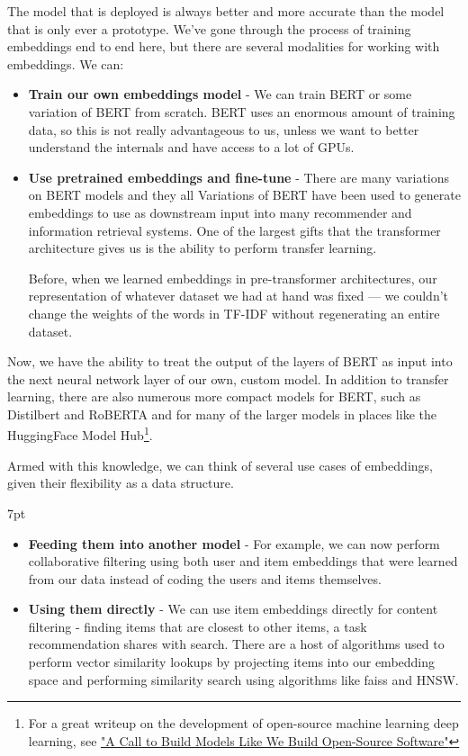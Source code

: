 \documentclass[11pt, table]{diazessay} %
\newenvironment{formal}{%
  \def\FrameCommand{%
	\hspace{1pt}%
	{\color{w_lightblue}\vrule width 2pt}%
	{\color{formalshade}\vrule width 4pt}%
	\colorbox{formalshade}%
  }%
  \MakeFramed{\advance\hsize-\width\FrameRestore}%
  \noindent\hspace{-4.55pt}%
  \begin{adjustwidth}{}{7pt}%
  \vspace{2pt}\vspace{2pt}%
}
{%
  \vspace{2pt}\end{adjustwidth}\endMakeFramed%
}
\begin{document}
\begin{sloppypar}
The model that is deployed is always better and more accurate than the model that is only ever a prototype. We've gone through the process of training embeddings end to end here, but there are several modalities for working with embeddings. We can:

\begin{itemize}
\item \textbf{Train our own embeddings model} - We can train BERT or some variation of BERT from scratch. BERT uses an enormous amount of training data, so this is not really advantageous to us, unless we want to better understand the internals and have access to a lot of GPUs.
\item \textbf{Use pretrained embeddings and fine-tune } - There are many variations on BERT models and they all Variations of BERT have been used to generate embeddings to use as downstream input into many recommender and information retrieval systems.  One of the largest gifts that the transformer architecture gives us is the ability to perform transfer learning. 

Before, when we learned embeddings in pre-transformer architectures, our representation of whatever dataset we had at hand was fixed --- we couldn't change the weights of the words in TF-IDF without regenerating an entire dataset. 
\end{itemize}

Now, we have the ability to treat the output of the layers of BERT as input into the next neural network layer of our own, custom model. In addition to transfer learning, there are also numerous more compact models for BERT, such as Distilbert and RoBERTA and for many of the larger models in places like the HuggingFace Model Hub\footnote{For a great writeup on the development of open-source machine learning deep learning, see  \href{https://colinraffel.com/blog/a-call-to-build-models-like-we-build-open-source-software.html}{"A Call to Build Models Like We Build Open-Source Software"}}.  

Armed with this knowledge, we can think of several use cases of embeddings, given their flexibility as a data structure.

\begin{formal}
\begin{itemize}
\item\textbf{Feeding them into another model} - For example, we can now perform collaborative filtering using both user and item embeddings that were learned from our data instead of coding the users and items themselves.
\item\textbf{Using them directly} - We can use item embeddings directly for content filtering - finding items that are closest to other items, a task recommendation shares with search. There are a host of algorithms used to perform vector similarity lookups by projecting items into our embedding space and performing similarity search using algorithms like faiss and HNSW.   
\end{itemize}
\end{formal}


\end{sloppypar}
\end{document}
